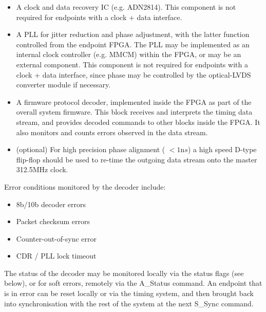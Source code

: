 \documentclass{dune}
\begin{document}
\begin{itemize}
	\item A clock and data recovery IC (e.g. ADN2814). This component is not required for endpoints with a clock + data interface.
	\item A PLL for jitter reduction and phase adjustment, with the latter function controlled from the endpoint FPGA. The PLL may be implemented as an internal clock controller (e.g. MMCM) within the FPGA, or may be an external component. This component is not required for endpoints with a clock + data interface, since phase may be controlled by the optical-LVDS converter module if necessary.
	\item A firmware protocol decoder, implemented inside the FPGA as part of the overall system firmware. This block receives and interprets the timing data stream, and provides decoded commands to other blocks inside the FPGA. It also monitors and counts errors observed in the data stream.
	\item(optional) For high precision phase alignment ( $< 1{\mathrm ns}$) a high speed D-type flip-flop should be used to re-time the outgoing data stream onto the master 312.5MHz clock.
\end{itemize}

Error conditions monitored by the decoder include:

\begin{itemize}
	\item 8b/10b decoder errors
	\item Packet checksum errors
	\item Counter-out-of-sync error
	\item CDR / PLL lock timeout
\end{itemize}

The status of the decoder may be monitored locally via the status flags (see below), or for soft errors, remotely via the A\_Status command. An endpoint that is in error can be reset locally or via the timing system, and then brought back into synchronisation with the rest of the system at the next S\_Sync command.
\end{document}
